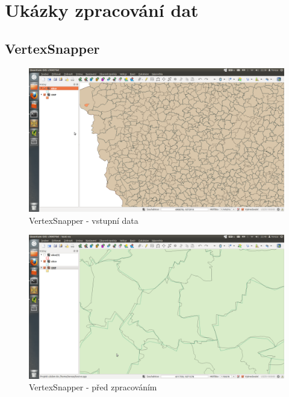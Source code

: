 \chapter{Ukázky zpracování dat}
\label{priloha-ukazky}

\section{VertexSnapper}
\label{ukazky-vs}

  \begin{figure}[H]
    \centering
      \includegraphics[width=400pt]{./pictures/test-vs1.png}
      \caption{VertexSnapper - vstupní data}
      \label{fig:vs1}
  \end{figure}

  \begin{figure}[H]
    \centering
      \includegraphics[width=400pt]{./pictures/test-vs2.png}
      \caption{VertexSnapper - před zpracováním}
      \label{fig:vs2}
  \end{figure}

